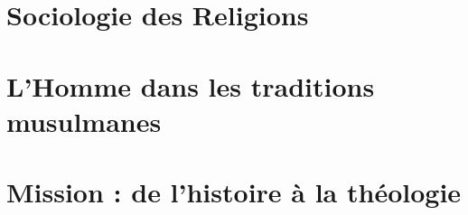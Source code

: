\documentclass[oneside,10pt]{book}
\begin{document}
 







\setcounter{page}{1}
 



%
%

% 
%
%
%

%
%

% 
 
 
 
 
  
 \part{Sociologie des Religions}
 
 
  
 
 
 
  
  
 


 
  \part{L'Homme dans les traditions musulmanes}
 
 
 
 
    
   
 
 \part{Mission : de l'histoire à la théologie}
 
 
  
 
 
 
  
  
  
 

% 
 
\end{document}

